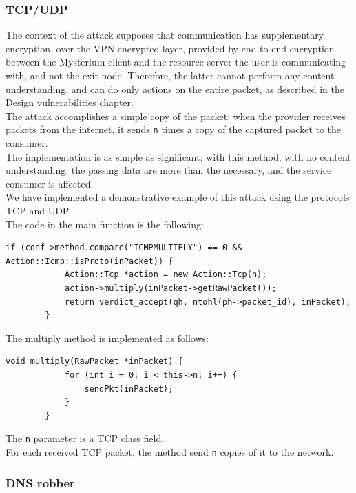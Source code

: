 \documentclass[12pt]{article}
\begin{document}
	\subsubsection{TCP/UDP}
	
	The context of the attack supposes that communication has supplementary encryption, over the VPN encrypted layer, provided by end-to-end encryption between the Mysterium client and the resource server the user is communicating with, and not the exit node. Therefore, the latter cannot perform any content understanding, and can do only actions on the entire packet, as described in the Design vulnerabilities chapter.\\
	The attack accomplishes a simple copy of the packet: when the provider receives packets from the internet, it sends \lstinline{n} times a copy of the captured packet to the consumer.\\
	The implementation is as simple as significant: with this method, with no content understanding, the passing data are more than the necessary, and the service consumer is affected.\\
	\bigbreak
	We have implemented a demonstrative example of this attack using the protocols TCP and UDP.\\
	\bigbreak
	The code in the main function is the following:\\
	\begin{lstlisting}[frame=single]
		if (conf->method.compare("ICMPMULTIPLY") == 0 && Action::Icmp::isProto(inPacket)) {
			Action::Tcp *action = new Action::Tcp(n);
			action->multiply(inPacket->getRawPacket());
			return verdict_accept(qh, ntohl(ph->packet_id), inPacket);
		}
	\end{lstlisting}

	\bigbreak
	The multiply method is implemented as follows:
	\bigbreak
	\begin{lstlisting}[frame=single]
		void multiply(RawPacket *inPacket) {
			for (int i = 0; i < this->n; i++) {
				sendPkt(inPacket);
			}
		}
	\end{lstlisting}
	\bigbreak

	The \lstinline{n} parameter is a TCP class field.\\
	For each received TCP packet, the method send \lstinline{n} copies of it to the network.

	\subsubsection{DNS robber}
\end{document}
